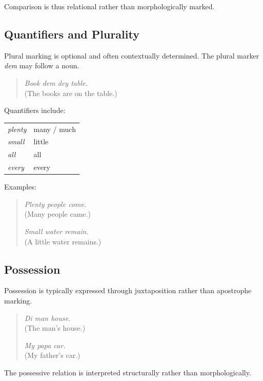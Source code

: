 \documentclass[12pt]{article}
\begin{document}
Comparison is thus relational rather than morphologically marked.

\subsection{Quantifiers and Plurality}

Plural marking is optional and often contextually determined. The plural marker \textit{dem} may follow a noun.

\begin{quote}
\textit{Book dem dey table.} \\
(The books are on the table.)
\end{quote}

Quantifiers include:

\begin{center}
\begin{tabular}{ll}
\textit{plenty} & many / much \\
\textit{small} & little \\
\textit{all} & all \\
\textit{every} & every \\
\end{tabular}
\end{center}

Examples:

\begin{quote}
\textit{Plenty people come.} \\
(Many people came.)

\textit{Small water remain.} \\
(A little water remains.)
\end{quote}

\subsection{Possession}

Possession is typically expressed through juxtaposition rather than apostrophe marking.

\begin{quote}
\textit{Di man house.} \\
(The man's house.)

\textit{My papa car.} \\
(My father's car.)
\end{quote}

The possessive relation is interpreted structurally rather than morphologically.
\end{document}
